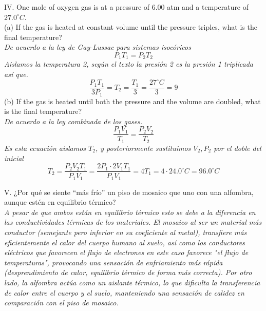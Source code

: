 \documentclass{article}
\newcommand{\cls}{^{\circ}C}
\begin{document}
IV. One mole of oxygen gas is at a pressure of 6.00 atm and a temperature of $27.0\cls$.\\
(a) If the gas is heated at constant volume until the pressure triples, what is the final temperature?\\
\textit{De acuerdo a la ley de Gay-Lussac para sistemas isocóricos}
\begin{equation}
    P_1T_1 = P_2T_2
\end{equation}
\textit{Aislamos la temperatura 2, según el texto la presión 2 es la presión 1 triplicada así que.}
\begin{equation*}
    \frac{P_1T_1}{3P_1} = T_2 = \frac{T_1}{3} = \frac{27\cls}{3} = 9
\end{equation*}
(b) If the gas is heated until both the pressure and the volume are doubled, what is the final temperature? \\
\textit{De acuerdo a la ley combinada de los gases.}
\begin{equation}
    \frac{P_1V_1}{T_1} = \frac{P_2V_2}{T_2}
\end{equation}
\textit{Es esta ecuación aislamos $T_2$, y posteriormente sustituimos $V_2,P_2$ por el doble del inicial}
\begin{equation*}
    T_2 = \frac{P_2V_2T_1}{P_1V_1} = \frac{2P_1\cdot2V_1T_1}{P_1V_1} = 4T_1 = 4\cdot24.0\cls = 96.0 \cls
\end{equation*}

V. ¿Por qué se siente “más frío” un piso de mosaico que uno con una alfombra, aunque estén
en equilibrio térmico? \\
\textit{A pesar de que ambos están en equilibrio térmico esto se debe a la diferencia en las conductividades térmicas de los materiales. El mosaico al ser un material más conductor (semejante pero inferior en su coeficiente al metal), transfiere más eficientemente el calor del cuerpo humano al suelo, así como los conductores eléctricos que favorecen el flujo de electrones en este caso favorece "el flujo de temperaturas", provocando una sensación de enfriamiento más rápida (desprendimiento de calor, equilibrio térmico de forma más correcta). Por otro lado, la alfombra actúa como un aislante térmico, lo que dificulta la transferencia de calor entre el cuerpo y el suelo, manteniendo una sensación de calidez en comparación con el piso de mosaico.} \\\\
\end{document}
